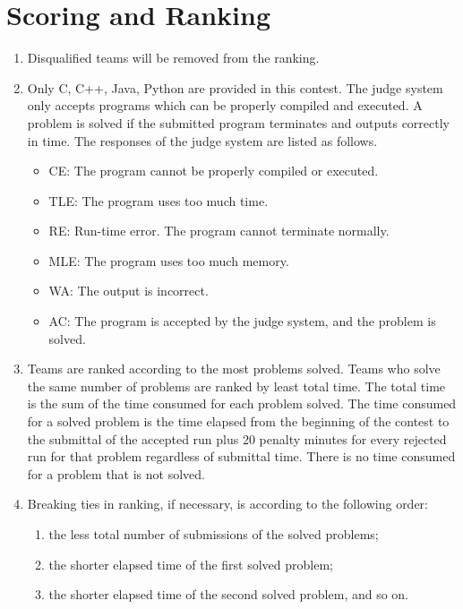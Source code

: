 \section*{Scoring and Ranking}
\begin{enumerate}
\item Disqualified teams will be removed from the ranking.
\item Only C, C++, Java, Python are provided in this contest. The judge system only accepts programs which can be properly compiled and executed. A problem is solved if the submitted program terminates and outputs correctly in time. The responses of the judge system are listed as follows.
{	\setlength{\parskip}{1pt}
	\begin{itemize}
    \item CE: The program cannot be properly compiled or executed.
    \item TLE: The program uses too much time.
    \item RE: Run-time error. The program cannot terminate normally.
    \item MLE: The program uses too much memory.
    \item WA: The output is incorrect.
    \item AC: The program is accepted by the judge system, and the problem is solved.
    \end{itemize}
}
\item Teams are ranked according to the most problems solved. Teams who solve the same number of problems are ranked by least total time. The total time is the sum of the time consumed for each problem solved. The time consumed for a solved problem is the time elapsed from the beginning of the contest to the submittal of the accepted run plus 20 penalty minutes for every rejected run for that problem regardless of submittal time. There is no time consumed for a problem that is not solved.

\item Breaking ties in ranking, if necessary, is according to the following order:
{	\setlength{\parskip}{1pt}
    \begin{enumerate}
  	\item the less total number of submissions of the solved problems;
  	\item the shorter elapsed time of the first solved problem;
  	\item the shorter elapsed time of the second solved problem, and so on.
  	\end{enumerate}
}
\end{enumerate}

\newpage

